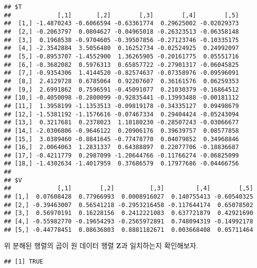 \documentclass[]{book}
\newenvironment{Shaded}{\begin{snugshade}}{\end{snugshade}}
\newcommand{\KeywordTok}[1]{\textcolor[rgb]{0.13,0.29,0.53}{\textbf{#1}}}
\newcommand{\NormalTok}[1]{#1}
\newcommand{\OperatorTok}[1]{\textcolor[rgb]{0.81,0.36,0.00}{\textbf{#1}}}
\newcommand{\StringTok}[1]{\textcolor[rgb]{0.31,0.60,0.02}{#1}}
\begin{document}
\begin{verbatim}
## $T
##             [,1]       [,2]        [,3]        [,4]        [,5]
##  [1,] -1.4870243 -0.6066594 -0.63361774  0.29625002 -0.02029373
##  [2,] -0.2063797  0.0804627 -0.04965018 -0.26323513 -0.06358148
##  [3,]  0.1968538 -0.9704605 -0.39507856 -0.27123746 -0.10335175
##  [4,] -2.3542884  3.5056480  0.16252734 -0.02524925  0.24992097
##  [5,] -0.8953707 -1.4552900  1.36265905 -0.20161775  0.05551716
##  [6,] -0.3682082  0.5976313  0.65857722 -0.27901317 -0.06045825
##  [7,] -0.9354306  1.4144520 -0.82574637 -0.07358976 -0.09596091
##  [8,]  2.4129728  0.6785064  0.92207607  0.36161576  0.06259353
##  [9,]  2.6991862  0.7596591 -0.45091077  0.21030379 -0.16864512
## [10,] -0.4050098 -0.2800099 -0.92835441 -0.13993488 -0.00181112
## [11,]  1.3958199 -1.1353513 -0.09819178 -0.34335127  0.09498679
## [12,] -1.5381192 -1.1576616 -0.07467334  0.29404424 -0.05243094
## [13,]  0.3217681  0.2378023  1.10180230 -0.28507243 -0.03066677
## [14,] -2.0306806 -0.9646122  0.20906176  0.39639757  0.08577858
## [15,]  3.0389460 -0.8841645 -0.77478770  0.04079852  0.34968846
## [16,]  2.0064063  1.2831337  0.64388897  0.22077706 -0.18836687
## [17,] -0.4211779  0.2987099 -1.20644766 -0.11766274 -0.06825099
## [18,] -1.4302634 -1.4017959  0.37686579  0.17977686 -0.04466756
## 
## $V
##             [,1]        [,2]          [,3]         [,4]        [,5]
## [1,]  0.07608428  0.77966993  0.0008916027  0.140755413 -0.60540325
## [2,] -0.39463007  0.56541218 -0.2953216458 -0.117644174  0.65078502
## [3,]  0.56970191  0.16228156  0.2412221083  0.637721879  0.42921690
## [4,] -0.55982770 -0.19654293 -0.2565972891  0.748094319 -0.14992178
## [5,] -0.44778451  0.08636803  0.8881182671  0.003668408  0.05711464
\end{verbatim}

위 분해된 행렬의 곱이 원 데이터 행렬 \(\mathbf{Z}\)과 일치하는지 확인해보자.

\begin{Shaded}
\end{Shaded}

\begin{verbatim}
## [1] TRUE
\end{verbatim}
\end{document}
